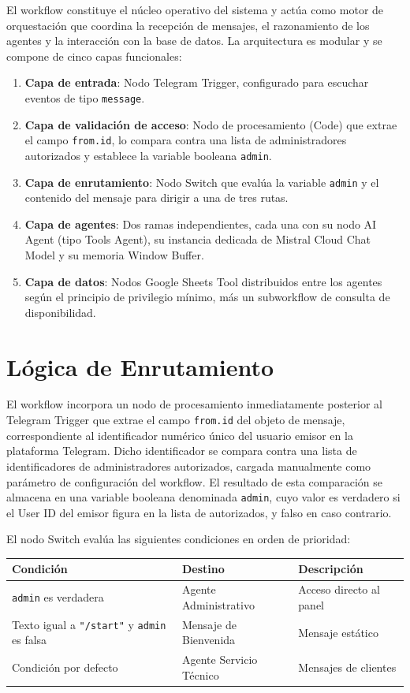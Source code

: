 \documentclass[12pt,a4paper]{report}
\begin{document}
El workflow constituye el núcleo operativo del sistema y actúa como motor de orquestación que coordina la recepción de mensajes, el razonamiento de los agentes y la interacción con la base de datos. La arquitectura es modular y se compone de cinco capas funcionales:

\begin{enumerate}
  \item \textbf{Capa de entrada}: Nodo Telegram Trigger, configurado para escuchar eventos de tipo \texttt{message}.
  \item \textbf{Capa de validación de acceso}: Nodo de procesamiento (Code) que extrae el campo \texttt{from.id}, lo compara contra una lista de administradores autorizados y establece la variable booleana \texttt{admin}.
  \item \textbf{Capa de enrutamiento}: Nodo Switch que evalúa la variable \texttt{admin} y el contenido del mensaje para dirigir a una de tres rutas.
  \item \textbf{Capa de agentes}: Dos ramas independientes, cada una con su nodo AI Agent (tipo Tools Agent), su instancia dedicada de Mistral Cloud Chat Model y su memoria Window Buffer.
  \item \textbf{Capa de datos}: Nodos Google Sheets Tool distribuidos entre los agentes según el principio de privilegio mínimo, más un subworkflow de consulta de disponibilidad.
\end{enumerate}

\section{Lógica de Enrutamiento}
\label{sec:enrutamiento}

El workflow incorpora un nodo de procesamiento inmediatamente posterior al Telegram Trigger que extrae el campo \texttt{from.id} del objeto de mensaje, correspondiente al identificador numérico único del usuario emisor en la plataforma Telegram. Dicho identificador se compara contra una lista de identificadores de administradores autorizados, cargada manualmente como parámetro de configuración del workflow. El resultado de esta comparación se almacena en una variable booleana denominada \texttt{admin}, cuyo valor es verdadero si el User ID del emisor figura en la lista de autorizados, y falso en caso contrario.

El nodo Switch evalúa las siguientes condiciones en orden de prioridad:

\begin{center}
\begin{tabular}{lll}
\toprule
Condición & Destino & Descripción \\
\midrule
\texttt{admin} es verdadera & Agente Administrativo & Acceso directo al panel \\
\addlinespace
Texto igual a \texttt{"/start"} y \texttt{admin} es falsa & Mensaje de Bienvenida & Mensaje estático \\
\addlinespace
Condición por defecto & Agente Servicio Técnico & Mensajes de clientes \\
\bottomrule
\end{tabular}
\end{center}
\end{document}
